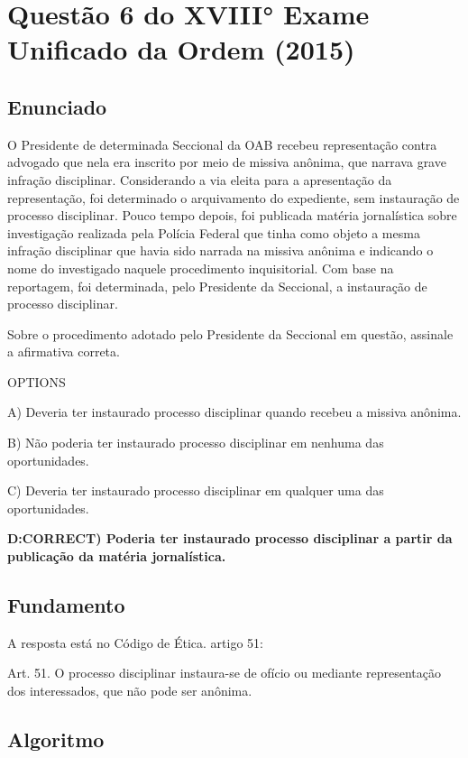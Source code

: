 \documentclass[12pt]{article}
\begin{document}
\section{Questão 6 do XVIII° Exame Unificado da Ordem (2015)}

\subsection{Enunciado}

O Presidente de determinada Seccional da OAB recebeu 
representação contra advogado que nela era inscrito por meio 
de missiva anônima, que narrava grave infração disciplinar. 
Considerando a via eleita para a apresentação da representação, foi determinado o arquivamento do expediente, sem instauração de processo disciplinar. Pouco tempo depois, foi publicada matéria jornalística sobre investigação realizada pela Polícia Federal que tinha como objeto a mesma infração disciplinar que havia sido narrada na  missiva anônima e indicando o nome do investigado naquele procedimento inquisitorial. Com base na reportagem, foi determinada, pelo Presidente da Seccional, a instauração de processo disciplinar. 
 
Sobre o procedimento adotado pelo Presidente da Seccional 
em questão, assinale a afirmativa correta. 

OPTIONS

A) Deveria ter instaurado processo disciplinar quando 
recebeu a missiva anônima. 

B) Não poderia ter instaurado processo disciplinar em 
nenhuma das oportunidades. 

C) Deveria ter instaurado processo disciplinar em qualquer 
uma das oportunidades. 

\textbf{D:CORRECT) Poderia ter instaurado processo disciplinar a partir da publicação da matéria jornalística.}

\subsection{Fundamento}

A resposta está no Código de Ética. artigo 51:

Art. 51. O processo disciplinar instaura-se de ofício ou mediante representação dos interessados, que não pode ser anônima.

\subsection{Algoritmo}
\end{document}

